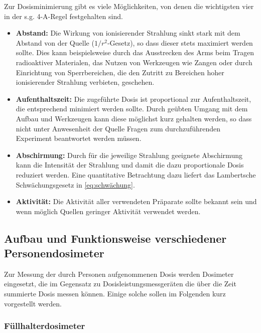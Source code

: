 \documentclass[11pt, a4paper]{article}
\numberwithin{equation}{section}
\begin{document}
Zur Dosisminimierung gibt es viele Möglichkeiten, von denen die wichtigsten vier in der s.g. 4-A-Regel festgehalten sind.
\begin{itemize}
	\item \textbf{Abstand:}
	Die Wirkung von ionisierender Strahlung sinkt stark mit dem Abstand von der Quelle ($1/r^2$-Gesetz), so dass dieser stets maximiert werden sollte.
	Dies kann beispielsweise durch das Ausstrecken des Arms beim Tragen radioaktiver Materialen, das Nutzen von Werkzeugen wie Zangen oder durch Einrichtung von Sperrbereichen, die den Zutritt zu Bereichen hoher ionisierender Strahlung verbieten, geschehen.	
	
	\item \textbf{Aufenthaltszeit:}
	Die zugeführte Dosis ist proportional zur Aufenthaltszeit, die entsprechend minimiert werden sollte.
	Durch geübten Umgang mit dem Aufbau und Werkzeugen kann diese möglichst kurz gehalten werden, so dass nicht unter Anwesenheit der Quelle Fragen zum durchzuführenden Experiment beantwortet werden müssen.	
	
	\item \textbf{Abschirmung:}
	Durch für die jeweilige Strahlung geeignete Abschirmung kann die Intensität der Strahlung und damit die dazu proportionale Dosis reduziert werden.
	Eine quantitative Betrachtung dazu liefert das Lambertsche Schwächungsgesetz in \eqref{eq:schwächung}.		
	
	\item \textbf{Aktivität:}
	Die Aktivität aller verwendeten Präparate sollte bekannt sein und wenn möglich Quellen geringer Aktivität verwendet werden.
\end{itemize}

\subsection{Aufbau und Funktionsweise verschiedener Personendosimeter}

Zur Messung der durch Personen aufgenommenen Dosis werden Dosimeter eingesetzt, die im Gegensatz zu Dosisleistungsmessgeräten die über die Zeit summierte Dosis messen können.
Einige solche sollen im Folgenden kurz vorgestellt werden.

\subsubsection{Füllhalterdosimeter}
\end{document}
